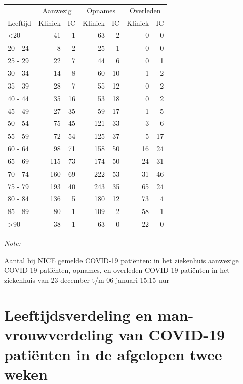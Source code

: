 \documentclass[
  english,
  man,floatsintext]{apa6}
\begin{document}
\begin{table}
\centering\begingroup\fontsize{10}{12}\selectfont

\begin{threeparttable}
\begin{tabular}{lrrrrrr}
\toprule
\multicolumn{1}{c}{ } & \multicolumn{2}{c}{Aanwezig} & \multicolumn{2}{c}{Opnames} & \multicolumn{2}{c}{Overleden} \\
\cmidrule(l{3pt}r{3pt}){2-3} \cmidrule(l{3pt}r{3pt}){4-5} \cmidrule(l{3pt}r{3pt}){6-7}
Leeftijd & Kliniek & IC & Kliniek & IC & Kliniek & IC\\
\midrule
<20 & 41 & 1 & 63 & 2 & 0 & 0\\
20 - 24 & 8 & 2 & 25 & 1 & 0 & 0\\
25 - 29 & 22 & 7 & 44 & 6 & 0 & 1\\
30 - 34 & 14 & 8 & 60 & 10 & 1 & 2\\
35 - 39 & 28 & 7 & 55 & 12 & 0 & 2\\
40 - 44 & 35 & 16 & 53 & 18 & 0 & 2\\
45 - 49 & 27 & 35 & 59 & 17 & 1 & 5\\
50 - 54 & 75 & 45 & 121 & 33 & 3 & 6\\
55 - 59 & 72 & 54 & 125 & 37 & 5 & 17\\
60 - 64 & 98 & 71 & 158 & 50 & 16 & 24\\
65 - 69 & 115 & 73 & 174 & 50 & 24 & 31\\
70 - 74 & 160 & 69 & 222 & 53 & 31 & 46\\
75 - 79 & 193 & 40 & 243 & 35 & 65 & 24\\
80 - 84 & 136 & 5 & 180 & 12 & 73 & 4\\
85 - 89 & 80 & 1 & 109 & 2 & 58 & 1\\
>90 & 38 & 1 & 63 & 0 & 22 & 0\\
\bottomrule
\end{tabular}
\begin{tablenotes}
\item \textit{Note: } 
\item Aantal bij NICE gemelde COVID-19 patiënten: in het ziekenhuis aanwezige COVID-19 patiënten, opnames, en overleden COVID-19 patiënten in het ziekenhuis van 23 december t/m 06 januari 15:15 uur
\end{tablenotes}
\end{threeparttable}
\endgroup{}
\end{table}

\newpage

\hypertarget{leeftijdsverdeling-en-man-vrouwverdeling-van-covid-19-patiuxebnten-in-de-afgelopen-twee-weken}{%
\section{Leeftijdsverdeling en man-vrouwverdeling van COVID-19 patiënten in de afgelopen twee weken}\label{leeftijdsverdeling-en-man-vrouwverdeling-van-covid-19-patiuxebnten-in-de-afgelopen-twee-weken}}
\end{document}
